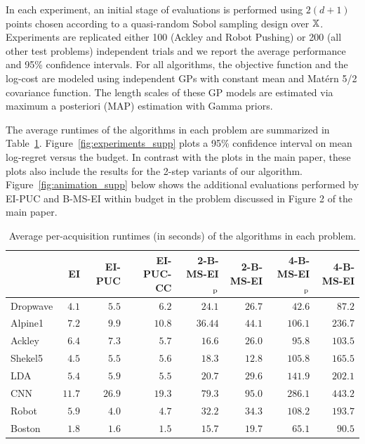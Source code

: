 In each experiment, an initial stage of evaluations is performed using $2(d+1)$ points chosen according to a quasi-random Sobol sampling design over $\mathbb{X}$. Experiments are replicated either 100 (Ackley and Robot Pushing) or 200 (all other test problems) independent trials and we report the average performance and 95\% confidence intervals. For all algorithms, the objective function and the log-cost are modeled using independent GPs with constant mean and Mat\'ern 5/2 covariance function. The length scales of these GP models are estimated via maximum a posteriori (MAP) estimation with Gamma priors.

The average runtimes of the algorithms in each problem are summarized in  Table~\ref{table:runtimes}. Figure~\ref{fig:experiments_supp} plots a 95\% confidence interval on mean log-regret versus the budget. In contrast with the plots in the main paper, these plots also include the results for the 2-step variants of our algorithm. Figure~\ref{fig:animation_supp} below shows the additional evaluations performed by EI-PUC and B-MS-EI within budget in the problem discussed in Figure 2 of the main paper.

\begin{table}
\caption{Average per-acquisition runtimes (in seconds) of the algorithms in each problem.}
\label{table:runtimes}
\begin{center}
\begin{footnotesize}
\begin{tabular}{lrrrrrrr}
\toprule
& EI & EI-PUC & EI-PUC-CC &  2-B-MS-EI$_\textnormal{p}$ &  2-B-MS-EI &  4-B-MS-EI$_\textnormal{p}$ &  4-B-MS-EI\\
\midrule
Dropwave  &  $4.1$ & $5.5$ & $6.2$ & $24.1$ & $26.7$ & $42.6$ & $87.2$\\
Alpine1    & $7.2$  & $9.9$ & $10.8$ & $36.44$ & $44.1$ & $106.1$ & $236.7$\\
Ackley    & $6.4$ & $7.3$ & $5.7$ & $16.6$ & $26.0$ & $95.8$ & $103.5$\\
Shekel5        & $4.5$ & $5.5$ &  $5.6$ & $18.3$ & $12.8$ & $105.8$ & $165.5$ \\
LDA & $5.4$ & $5.9$ &  $5.5$ & $20.7$ & $29.6$ & $141.9$ & $202.1$ \\
CNN & $11.7$ & $26.9$ &  $19.3$ & $79.3$ & $95.0$ & $286.1$ & $443.2$ \\
Robot & $5.9$ & $4.0$ &  $4.7$ & $32.2$ & $34.3$ & $108.2$ & $193.7$ \\
{Boston} & $1.8$ & $1.6$ &  $1.5$ & $15.7$ & $19.7$ & $65.1$ & $90.5$ \\

\bottomrule
\end{tabular}
\end{footnotesize}
\end{center}
\end{table}

